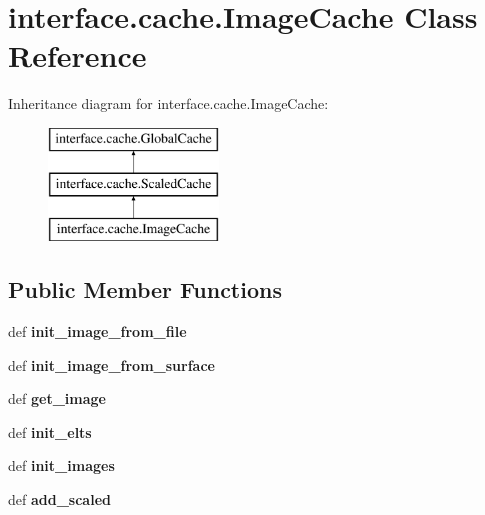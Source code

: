 \hypertarget{classinterface_1_1cache_1_1_image_cache}{\section{interface.\-cache.\-Image\-Cache \-Class \-Reference}
\label{classinterface_1_1cache_1_1_image_cache}
}
\-Inheritance diagram for interface.\-cache.\-Image\-Cache\-:\begin{figure}[H]
\begin{center}
\leavevmode
\includegraphics[height=3.000000cm]{classinterface_1_1cache_1_1_image_cache}
\end{center}
\end{figure}
\subsection*{\-Public \-Member \-Functions}
\begin{DoxyCompactItemize}
\item 
\hypertarget{classinterface_1_1cache_1_1_image_cache_a67306e2a9935733fa2b3f1fd30e74bf4}{def {\bfseries init\-\_\-image\-\_\-from\-\_\-file}}\label{classinterface_1_1cache_1_1_image_cache_a67306e2a9935733fa2b3f1fd30e74bf4}

\item 
\hypertarget{classinterface_1_1cache_1_1_image_cache_ae7ded9ebcbc43075f3c4d67f3f39b020}{def {\bfseries init\-\_\-image\-\_\-from\-\_\-surface}}\label{classinterface_1_1cache_1_1_image_cache_ae7ded9ebcbc43075f3c4d67f3f39b020}

\item 
\hypertarget{classinterface_1_1cache_1_1_image_cache_a585d1a6c7e619565d902e2d80627e24e}{def {\bfseries get\-\_\-image}}\label{classinterface_1_1cache_1_1_image_cache_a585d1a6c7e619565d902e2d80627e24e}

\item 
\hypertarget{classinterface_1_1cache_1_1_image_cache_aeb0d1c68b68729835c8e676e5837808f}{def {\bfseries init\-\_\-elts}}\label{classinterface_1_1cache_1_1_image_cache_aeb0d1c68b68729835c8e676e5837808f}

\item 
\hypertarget{classinterface_1_1cache_1_1_image_cache_a139077e504325b568f90930de7c3aca8}{def {\bfseries init\-\_\-images}}\label{classinterface_1_1cache_1_1_image_cache_a139077e504325b568f90930de7c3aca8}

\item 
\hypertarget{classinterface_1_1cache_1_1_image_cache_a8256c527238b39f23b8f606439114122}{def {\bfseries add\-\_\-scaled}}\label{classinterface_1_1cache_1_1_image_cache_a8256c527238b39f23b8f606439114122}

\end{DoxyCompactItemize}
